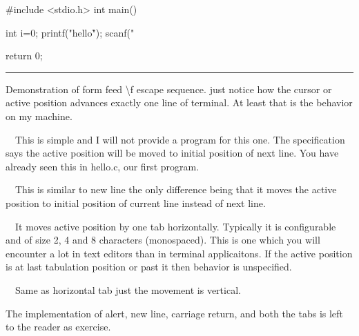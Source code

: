 #include <stdio.h>
int main()
{
  int i=0;
  printf("hello\f");
  scanf("%

  return 0;
}
\stopCPP
{}
\hrule
\blank[force,1mm]
\startalignment[middle]
Demonstration of form feed \backslash f escape sequence.
\stopalignment
just notice how the cursor or active position advances exactly one
line of terminal. At least that is the behavior on my machine.
\item{}\textreference[newline]~~This is simple and I
  will not provide a program for this one. The specification says the
  active position will be moved to initial position of next line. You
  have already seen this in hello.c, our first program.
\item{}\textreference[carriagereturn]~~This
  is similar to new line the only difference being that it moves the
  active position to initial position of current line instead of next
  line.
\item{}\textreference[tab]~~It moves active
  position by one tab horizontally. Typically it is configurable and
  of size 2, 4 and 8 characters (monospaced). This is one which you
  will encounter a lot in text editors than in terminal
  applicaitons. If the active position is at last tabulation position
  or past it then behavior is unspecified.
\item{}\textreference[vtab]~~Same as horizontal
  tab just the movement is vertical.
\stopitemize

The implementation of alert, new line, carriage return, and both the
tabs is left to the reader as exercise.
